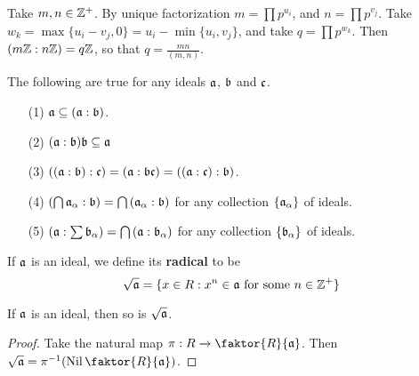 \begin{example}\label{example_5.20}
  Take $m,n \in \Z^+$. By unique factorization $m=\prod{p^{u_i}}$, and
  $n=\prod{p^{v_j}}$. Take $w_k=\max{\{u_i-v_j,0\}}=u_i-\min{\{u_i,v_j\}}$, and
  take $q=\prod{p^{w_k}}$. Then $(m\Z:n\Z)=q\Z$, so that $q=\frac{mn}{(m,n)}$.
\end{example}

\begin{lemma}\label{lemma_5.5.12}
  The following are true for any ideals $\af$,  $\bf$ and  $\cf$.
  \begin{enumerate}
    \item[(1)] $\af \subseteq (\af:\bf)$.

    \item[(2)] $(\af:\bf)\bf \subseteq \af$

    \item[(3)] $((\af:\bf):\cf)=(\af:\bf\cf)=((\af:\cf):\bf)$.

    \item[(4)] $(\bigcap{\af_\a}:\bf)=\bigcap{(\af_\a:\bf)}$ for any collection
      $\{\af_\a\}$ of ideals.

    \item[(5)] $(\af:\sum{\bf_\a})=\bigcap{(\af:\bf_\a)}$ for any collection
      $\{\bf_\a\}$ of ideals.
  \end{enumerate}
\end{lemma}

\begin{definition}
  If $\af$ is an ideal, we define its \textbf{radical} to be
  \begin{equation*}
    \sqrt{\af}=\{x \in R : x^n \in \af \text{ for some } n \in \Z^+\}
  \end{equation*}
\end{definition}

\begin{lemma}\label{lemma_5.5.13}
  If $\af$ is an ideal, then so is $\sqrt{\af}$.
\end{lemma}
\begin{proof}
  Take the natural map $\pi:R \xrightarrow{} \faktor{R}{\af}$. Then
  $\sqrt{\af}=\inv{\pi}(\Nil{\faktor{R}{\af}})$.
\end{proof}

